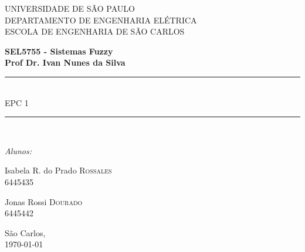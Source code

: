 \documentclass{report}
\begin{document}
\newcommand{\HRule}{\rule{\linewidth}{0.5mm}}
\newcommand{\tsize}[1]{(\frac{W}{L})_{#1}}
 

\begin{titlepage}

\begin{center}


{\LARGE UNIVERSIDADE DE SÃO PAULO\\}
{\LARGE DEPARTAMENTO DE ENGENHARIA ELÉTRICA \\}
{\LARGE ESCOLA DE ENGENHARIA DE SÃO CARLOS\\[4cm]}

\textbf{\large SEL5755 - Sistemas Fuzzy}\\[1cm]
\textbf{\large Prof Dr. Ivan Nunes da Silva}\\[2cm]


\HRule \\[0.6cm]
{ \huge EPC 1\bfseries }\\[0.6cm]

\HRule \\[2cm]


\begin{center} \large
\emph{Alunos:}\\
\end{center}

\begin{minipage}{0.4\textwidth}
\begin{flushleft} \large
Isabela R. do Prado \textsc{Rossales}\\
6445435
\end{flushleft}
\end{minipage}
\begin{minipage}{0.4\textwidth}
\begin{flushright} \large
Jonas Rossi \textsc{Dourado}\\
6445442
\end{flushright}
\end{minipage}

\vfill

{\large São Carlos,\\ \today}

\end{center}

\end{titlepage}
\end{document}
